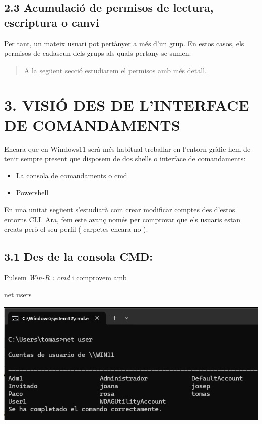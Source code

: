 \documentclass[
  a4paper,
]{article}
\newenvironment{Shaded}{\begin{snugshade}}{\end{snugshade}}
\newcommand{\NormalTok}[1]{#1}
\providecommand{\tightlist}{%
  \setlength{\itemsep}{0pt}\setlength{\parskip}{0pt}}
\begin{document}
\subsection{2.3 Acumulació de permisos de lectura, escriptura o
canvi}\label{acumulaciuxf3-de-permisos-de-lectura-escriptura-o-canvi}

Per tant, un mateix usuari pot pertànyer a més d'un grup. En estos
casos, els permisos de cadascun dels grups als quals pertany se sumen.

\begin{quote}
A la següent secció estudiarem el permisos amb més detall.
\end{quote}

\section{3. VISIÓ DES DE L'INTERFACE DE
COMANDAMENTS}\label{visiuxf3-des-de-linterface-de-comandaments}

Encara que en Windows11 serà més habitual treballar en l'entorn gràfic
hem de tenir sempre present que disposem de dos shells o interface de
comandaments:

\begin{itemize}
\tightlist
\item
  La consola de comandaments o cmd
\item
  Powershell
\end{itemize}

En una unitat següent s'estudiarà com crear modificar comptes des
d'estos entorns CLI. Ara, fem este avanç només per comprovar que els
usuaris estan creats però el seu perfil ( carpetes encara no ).

\subsection{3.1 Des de la consola CMD:}\label{des-de-la-consola-cmd}

Pulsem \emph{Win-R : cmd} i comprovem amb

\begin{Shaded}
\begin{Highlighting}[]
\NormalTok{net users}
\end{Highlighting}
\end{Shaded}

\includegraphics{png/netUser.png}
\end{document}
